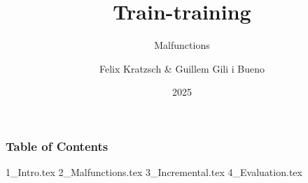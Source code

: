 \documentclass{beamer}
\title{Train-training}
\subtitle{Malfunctions}
\author{Felix  Kratzsch \& Guillem Gili i Bueno  }
\institute{Potsdam University - Railway Scheudling }
\date{2025}
\begin{document}
\frame{\titlepage}

\begin{frame}[label=toc]
\frametitle{Table of Contents}
\tableofcontents[]
\end{frame} 


{1_Intro.tex}
{2_Malfunctions.tex}
{3_Incremental.tex}
{4_Evaluation.tex}
\end{document}
